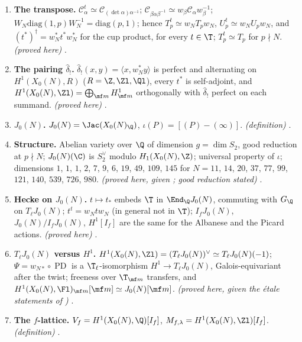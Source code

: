 \begin{enumerate}[label=\textbf{\thechapter.\arabic*}]
$\T$ is finite free over $\Z$. \emph{(proved here)} .
\item \textbf{The transpose.} $\mathcal C_\alpha^t\simeq\mathcal C_{(\det\alpha)\alpha^{-1}}$; $\mathcal C_{\beta\alpha\beta^{-1}}\simeq w_\beta\mathcal C_\alpha w_\beta^{-1}$; $W_N\mathrm{diag}(1,p)W_N^{-1}=\mathrm{diag}(p,1)$; hence $T_p^t\simeq w_NT_pw_N$,
$U_p^t\simeq w_NU_pw_N$, and $(t^*)^\dagger=w_N^*t^*w_N^*$ for the cup product, for every $t\in\T$; $T_p^t\simeq T_p$ for $p\nmid N$. \emph{(proved here)} .
\item \textbf{The pairing $\hat\delta_!$.} $\hat\delta_!(x,y)=\langle x,w_N^*y\rangle$ is perfect and alternating on $H^1(X_0(N),R)$ ($R=\Z,\Zl,\Ql$), every $t^*$ is self-adjoint, and $H^1(X_0(N),\Zl)=\bigoplus_{\mf m}H^1_{\mf m}$
orthogonally with $\hat\delta_!$ perfect on each summand. \emph{(proved here)} .
\item \textbf{$J_0(N)$.} $J_0(N)=\Jac(X_0(N)_\Q)$, $\iota(P)=[(P)-(\infty)]$. \emph{(definition)} .
\item \textbf{Structure.} Abelian variety over $\Q$ of dimension $g=\dim S_2$, good reduction at $p\nmid N$; $J_0(N)(\C)$ is $S_2^\vee$ modulo $H_1(X_0(N),\Z)$; universal property of $\iota$; dimensions $1$, $1$, $1$, $2$, $7$, $9$, $6$, $19$, $49$, $109$, $145$ for
$N=11$, $14$, $20$, $37$, $77$, $99$, $121$, $140$, $539$, $726$, $980$. \emph{(proved here, given ; good reduction stated)} .
\item \textbf{Hecke on $J_0(N)$.} $t\mapsto t_*$ embeds $\T$ in $\End_\Q J_0(N)$, commuting with $G_\Q$ on $T_\ell J_0(N)$; $t^t=w_Ntw_N$ (in general not in $\T$); $I_fJ_0(N)$, $J_0(N)/I_fJ_0(N)$, $H^1[I_f]$ are the same
for the Albanese and the Picard actions. \emph{(proved here)} .
\item \textbf{$T_\ell J_0(N)$ versus $H^1$.} $H^1(X_0(N),\Zl)=(T_\ell J_0(N))^\vee\simeq T_\ell J_0(N)(-1)$; $\Psi=w_{N*}\circ\operatorname{PD}$ is a $\T_\ell$-isomorphism $H^1\to T_\ell J_0(N)$, Galois-equivariant after
the twist; freeness over $\T_{\mf m}$ transfers, and $H^1(X_0(N),\Fl)_{\mf m}[\mf m]\simeq J_0(N)[\mf m]$. \emph{(proved here, given the \'etale statements of )}
.
\item \textbf{The $f$-lattice.} $V_f=H^1(X_0(N),\Q)[I_f]$, $M_{f,\lambda}=H^1(X_0(N),\Zl)[I_f]$. \emph{(definition)} .

\end{enumerate}
